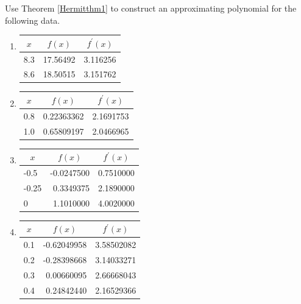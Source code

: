 \begin{myexercise}%
Use Theorem \ref{Hermitthm1} to construct an approximating polynomial for the following data.
\begin{enumerate}[label=(\alph*)]
\item
\begin{center}
\begin{tabular}{c|c|c}
$x$ & $f(x)$ & $f^{\prime}(x)$ \\
\hline
8.3 & 17.56492 & 3.116256 \\
8.6 & 18.50515 & 3.151762 \\
\end{tabular}
\end{center}

\item
\begin{center}
\begin{tabular}{c|c|c}
$x$ & $f(x)$ & $f^{\prime}(x)$ \\
\hline
0.8 & 0.22363362 & 2.1691753 \\
1.0 & 0.65809197 & 2.0466965 \\
\end{tabular}
\end{center}

\item
\begin{center}
\begin{tabular}{l|r|c}
\multicolumn{1}{c|}{$x$} & \multicolumn{1}{c|}{$f(x)$} & $f^{\prime}(x)$ \\
\hline
-0.5 & -0.0247500 & 0.7510000 \\
-0.25 & 0.3349375 & 2.1890000 \\
0 & 1.1010000 & 4.0020000 \\
\end{tabular}
\end{center}

\item
\begin{center}
\begin{tabular}{c|r|c}
$x$ & \multicolumn{1}{|c|}{$f(x)$} & \multicolumn{1}{c}{$f^{\prime}(x)$} \\
\hline
0.1 & -0.62049958 & 3.58502082 \\
0.2 & -0.28398668 & 3.14033271 \\
0.3 & 0.00660095 & 2.66668043 \\
0.4 & 0.24842440 & 2.16529366 \\
\end{tabular}
\end{center}
\end{enumerate}


\end{myexercise}
